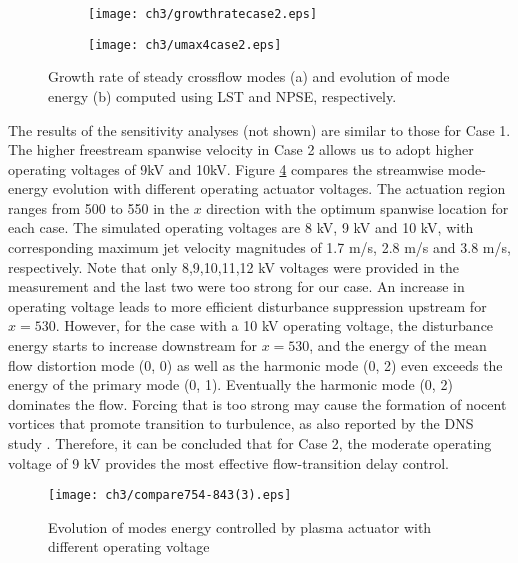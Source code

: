 \begin{figure}
  \centering
  \begin{subfigure}{0.48\linewidth}
    \label{modesenergycase3}
    \texttt{[image: ch3/growthratecase2.eps]}
  \end{subfigure}
  \begin{subfigure}{0.48\linewidth}
    \label{growthratecase3}
    \texttt{[image: ch3/umax4case2.eps]}
  \end{subfigure}
  \caption{Growth rate of steady crossflow modes (a) and evolution of mode energy (b) computed using LST and NPSE, respectively.}\label{f:baseline}
\end{figure}
The results of the sensitivity analyses (not shown) are similar to those for Case 1. The higher freestream spanwise velocity in Case 2 allows us to adopt higher operating voltages of 9kV and 10kV. Figure \ref{f:voltage} compares the streamwise mode-energy evolution with different operating actuator voltages. The actuation region ranges from 500 to 550 in the $x$ direction with the optimum spanwise location for each case. The simulated operating voltages are 8 kV, 9 kV and 10 kV, with corresponding maximum jet velocity magnitudes of 1.7 m/s, 2.8 m/s and 3.8 m/s, respectively. Note that only 8,9,10,11,12 kV voltages were provided in the measurement \cite{kriegseis2013velocity} and the last two were too strong for our case. An increase in operating voltage leads to more efficient disturbance suppression upstream for $x = 530$. However, for the case with a 10 kV operating voltage, the disturbance energy starts to increase downstream for $x = 530$, and the energy of the mean flow distortion mode (0, 0) as well as the harmonic mode (0, 2) even exceeds the energy of the primary mode (0, 1). Eventually the harmonic mode (0, 2) dominates the flow. Forcing that is too strong may cause the formation of nocent vortices that promote transition to turbulence, as also reported by the DNS study \cite{dorr2016}. Therefore, it can be concluded that for Case 2, the moderate operating voltage of 9 kV provides the most effective flow-transition delay control.

\begin{figure}
  \centering
  \texttt{[image: ch3/compare754-843(3).eps]}\\
  \caption{Evolution of modes energy controlled by plasma actuator with different operating voltage}\label{f:voltage}
\end{figure}
